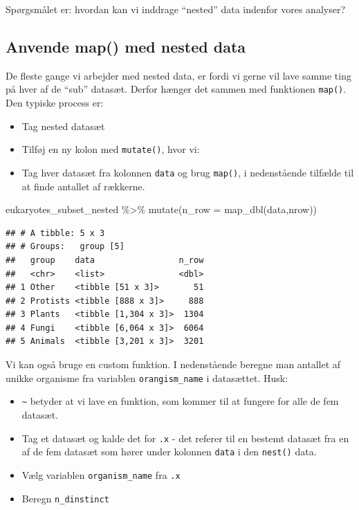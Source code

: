 \documentclass[
]{book}
\newenvironment{Shaded}{\begin{snugshade}}{\end{snugshade}}
\newcommand{\AttributeTok}[1]{\textcolor[rgb]{0.77,0.63,0.00}{#1}}
\newcommand{\FunctionTok}[1]{\textcolor[rgb]{0.00,0.00,0.00}{#1}}
\newcommand{\NormalTok}[1]{#1}
\newcommand{\SpecialCharTok}[1]{\textcolor[rgb]{0.00,0.00,0.00}{#1}}
\providecommand{\tightlist}{%
  \setlength{\itemsep}{0pt}\setlength{\parskip}{0pt}}
\begin{document}
Spørgsmålet er: hvordan kan vi inddrage ``nested'' data indenfor vores analyser?

\hypertarget{anvende-map-med-nested-data}{%
\subsection{Anvende map() med nested data}\label{anvende-map-med-nested-data}}

De fleste gange vi arbejder med nested data, er fordi vi gerne vil lave samme ting på hver af de ``sub'' datasæt. Derfor hænger det sammen med funktionen \texttt{map()}. Den typiske process er:

\begin{itemize}
\tightlist
\item
  Tag nested datasæt
\item
  Tilføj en ny kolon med \texttt{mutate()}, hvor vi:
\item
  Tag hver datasæt fra kolonnen \texttt{data} og brug \texttt{map()}, i nedenstående tilfælde til at finde antallet af rækkerne.
\end{itemize}

\begin{Shaded}
\begin{Highlighting}[]
\NormalTok{eukaryotes\_subset\_nested }\SpecialCharTok{\%\textgreater{}\%} 
  \FunctionTok{mutate}\NormalTok{(}\AttributeTok{n\_row =} \FunctionTok{map\_dbl}\NormalTok{(data,nrow))}
\end{Highlighting}
\end{Shaded}

\begin{verbatim}
## # A tibble: 5 x 3
## # Groups:   group [5]
##   group    data                 n_row
##   <chr>    <list>               <dbl>
## 1 Other    <tibble [51 x 3]>       51
## 2 Protists <tibble [888 x 3]>     888
## 3 Plants   <tibble [1,304 x 3]>  1304
## 4 Fungi    <tibble [6,064 x 3]>  6064
## 5 Animals  <tibble [3,201 x 3]>  3201
\end{verbatim}

Vi kan også bruge en custom funktion. I nedenstående beregne man antallet af unikke organisme fra variablen \texttt{orangism\_name} i datasættet. Husk:

\begin{itemize}
\tightlist
\item
  \texttt{\textasciitilde{}} betyder at vi lave en funktion, som kommer til at fungere for alle de fem datasæt.
\item
  Tag et datasæt og kalde det for \texttt{.x} - det referer til en bestemt datasæt fra en af de fem datasæt som hører under kolonnen \texttt{data} i den \texttt{nest()} data.
\item
  Vælg variablen \texttt{organism\_name} fra \texttt{.x}
\item
  Beregn \texttt{n\_dinstinct}
\end{itemize}
\end{document}
